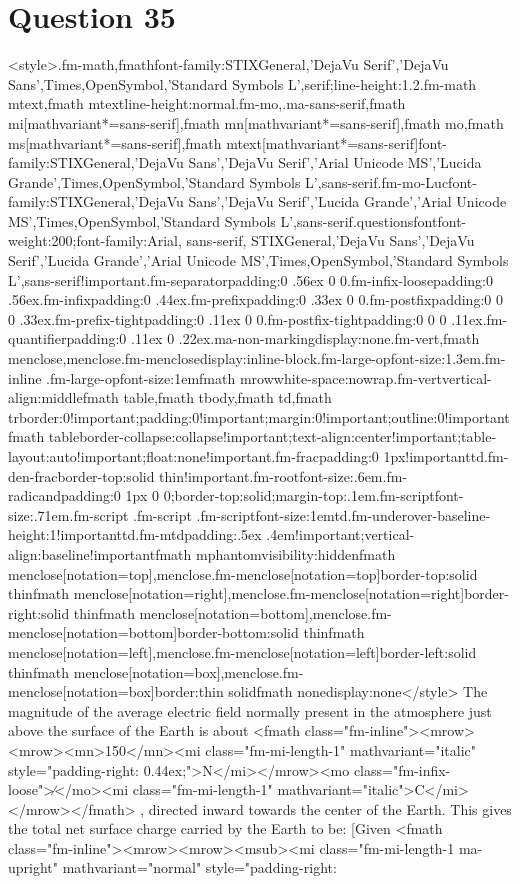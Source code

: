 \documentclass{article}
\begin{document}
\section*{Question 35}
<style>.fm-math,fmath{font-family:STIXGeneral,'DejaVu Serif','DejaVu Sans',Times,OpenSymbol,'Standard Symbols L',serif;line-height:1.2}.fm-math mtext,fmath mtext{line-height:normal}.fm-mo,.ma-sans-serif,fmath mi[mathvariant*=sans-serif],fmath mn[mathvariant*=sans-serif],fmath mo,fmath ms[mathvariant*=sans-serif],fmath mtext[mathvariant*=sans-serif]{font-family:STIXGeneral,'DejaVu Sans','DejaVu Serif','Arial Unicode MS','Lucida Grande',Times,OpenSymbol,'Standard Symbols L',sans-serif}.fm-mo-Luc{font-family:STIXGeneral,'DejaVu Sans','DejaVu Serif','Lucida Grande','Arial Unicode MS',Times,OpenSymbol,'Standard Symbols L',sans-serif}.questionsfont{font-weight:200;font-family:Arial, sans-serif, STIXGeneral,'DejaVu Sans','DejaVu Serif','Lucida Grande','Arial Unicode MS',Times,OpenSymbol,'Standard Symbols L',sans-serif!important}.fm-separator{padding:0 .56ex 0 0}.fm-infix-loose{padding:0 .56ex}.fm-infix{padding:0 .44ex}.fm-prefix{padding:0 .33ex 0 0}.fm-postfix{padding:0 0 0 .33ex}.fm-prefix-tight{padding:0 .11ex 0 0}.fm-postfix-tight{padding:0 0 0 .11ex}.fm-quantifier{padding:0 .11ex 0 .22ex}.ma-non-marking{display:none}.fm-vert,fmath menclose,menclose.fm-menclose{display:inline-block}.fm-large-op{font-size:1.3em}.fm-inline .fm-large-op{font-size:1em}fmath mrow{white-space:nowrap}.fm-vert{vertical-align:middle}fmath table,fmath tbody,fmath td,fmath tr{border:0!important;padding:0!important;margin:0!important;outline:0!important}fmath table{border-collapse:collapse!important;text-align:center!important;table-layout:auto!important;float:none!important}.fm-frac{padding:0 1px!important}td.fm-den-frac{border-top:solid thin!important}.fm-root{font-size:.6em}.fm-radicand{padding:0 1px 0 0;border-top:solid;margin-top:.1em}.fm-script{font-size:.71em}.fm-script .fm-script .fm-script{font-size:1em}td.fm-underover-base{line-height:1!important}td.fm-mtd{padding:.5ex .4em!important;vertical-align:baseline!important}fmath mphantom{visibility:hidden}fmath menclose[notation=top],menclose.fm-menclose[notation=top]{border-top:solid thin}fmath menclose[notation=right],menclose.fm-menclose[notation=right]{border-right:solid thin}fmath menclose[notation=bottom],menclose.fm-menclose[notation=bottom]{border-bottom:solid thin}fmath menclose[notation=left],menclose.fm-menclose[notation=left]{border-left:solid thin}fmath menclose[notation=box],menclose.fm-menclose[notation=box]{border:thin solid}fmath none{display:none}</style> The magnitude of the average electric field normally present in the atmosphere just above the surface of the Earth is about <fmath class="fm-inline"><mrow><mrow><mn>150</mn><mi class="fm-mi-length-1" mathvariant="italic" style="padding-right: 0.44ex;">N</mi></mrow><mo class="fm-infix-loose">∕</mo><mi class="fm-mi-length-1" mathvariant="italic">C</mi></mrow></fmath> , directed inward towards the center of the Earth. This gives the total net surface charge carried by the Earth to be: \newline [Given <fmath class="fm-inline"><mrow><mrow><msub><mi class="fm-mi-length-1 ma-upright" mathvariant="normal" style="padding-right: 
\end{document}
